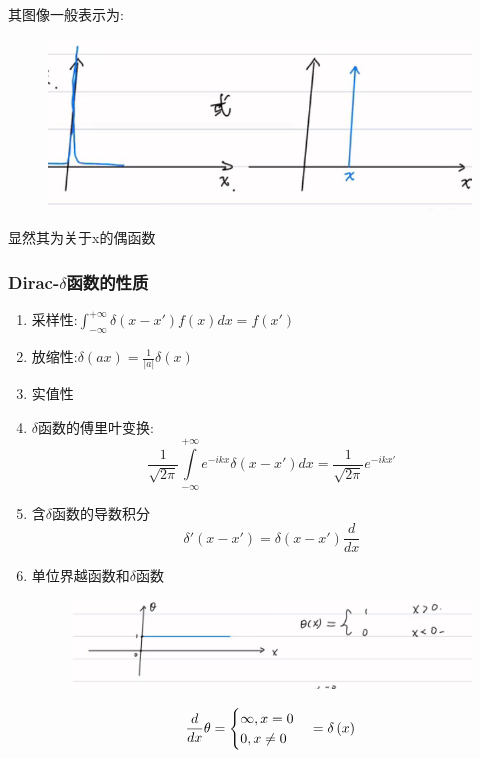 \documentclass[lang=cn,10pt]{elegantbook}
\begin{document}
 其图像一般表示为:
 \begin{figure}[H]
 	\centering
 	\includegraphics[width=0.7\linewidth]{figure/screenshot0018}
 \end{figure}
 显然其为关于x的偶函数
 \subsubsection{Dirac-$\delta$函数的性质}
 \begin{enumerate}
 	\item 采样性:$\int_{-\infty}^{+\infty}{\delta \left( x-x' \right) f\left( x \right) dx}=f\left( x' \right) 
 	$
 	\item 放缩性:$\delta \left( ax \right) =\frac{1}{|a|}\delta \left( x \right) 
 	$
 	\item 实值性
 	\item $\delta$函数的傅里叶变换:
 	\begin{equation*}
 		\frac{1}{\sqrt{2\pi}}\int\limits_{-\infty}^{+\infty}{e^{-ikx}\delta \left( x-x' \right) dx=}\frac{1}{\sqrt{2\pi}}e^{-ikx'}
 	\end{equation*}
 	\item 含$\delta$函数的导数积分
 	\begin{equation*}
 	\delta' \left( x-x' \right) =\delta \left( x-x' \right) \frac{d}{dx}
 	\end{equation*}
 	\item 单位界越函数和$\delta$函数
 	\begin{figure}[H]
 		\centering
 		\includegraphics[width=0.7\linewidth]{figure/screenshot0019}
 	\end{figure}
 	\begin{equation*}
 		\frac{d}{dx}\theta =\begin{cases}
 			\infty ,x=0\\
 			0,x\ne 0\\
 		\end{cases}=\delta \left( x \right)\\
 	\end{equation*}
 \end{enumerate}
\end{document}
